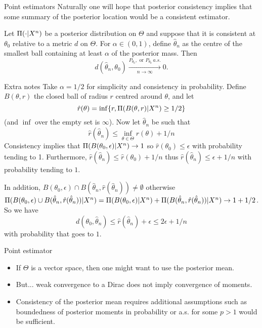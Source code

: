 \begin{frame}{Point estimators}
Naturally one will hope that posterior consistency implies that some summary of the posterior location would be a consistent estimator. 
\pause 

\begin{theorem}
Let $\Pi(\cdot|X^n)$ be a posterior distribution on $\Theta$ and suppose that it is consistent at $\theta_0$ relative to a metric $d$ on $\Theta$. For $\alpha \in (0,1)$, define $\hat{\theta}_n$ as the centre of the smallest ball containing at least $\alpha$ of the posterior mass. Then 
$$
d(\hat{\theta}_n, \theta_0) \xrightarrow[n\to \infty]{P_{\theta_0}, \text{ or } P_{\theta_0}~a.s. } 0. 
$$   
\end{theorem}
\end{frame}


\begin{frame}[allowframebreaks]{Extra notes}
	Take $\alpha = 1/2$ for simplicity and consistency in probability. Define $B(\theta,r)$ the closed ball of radius $r$ centred around $\theta$, and let 
	$$
\hat{r}(\theta) = \inf\{r, \Pi(B(\theta,r) | X^n)\geq 1/2  \}
	$$
	(and $\inf$ over the empty set is $\infty$). Now let $\hat{\theta}_n$ be such that 
	$$
\hat{r}(\hat{\theta}_n) \leq \inf_{\theta \in \Theta} r(\theta) + 1/n
	$$ 
	Consistency implies that $\Pi(B(\theta_0,\epsilon) |X^n) \to 1$ so $\hat{r}(\theta_0) \leq \epsilon$ with probability tending to 1. Furthermore, $\hat{r}(\hat{\theta}_n)  \leq \hat{r}(\theta_0) + 1/n $ thus $\hat{r}(\hat{\theta}_n)  \leq \epsilon + 1/n$ with probability tending to $1$.
 
	In addition, $B(\theta_0,\epsilon)\cap B(\hat{\theta}_n,\hat{r}(\hat{\theta}_n)) \neq \emptyset$ otherwise $\Pi(B(\theta_0,\epsilon)\cup B(\hat{\theta}_n,\hat{r}(\hat{\theta}_n)) |X^n) = \Pi(B(\theta_0,\epsilon)|X^n) + \Pi(B(\hat{\theta}_n,\hat{r}(\hat{\theta}_n)) |X^n) \to 1 + 1/2$. So we have 
	$$
d(\theta_0,\hat{\theta}_n) \leq \hat{r}(\hat{\theta}_n) + \epsilon \leq 2\epsilon + 1/n
	$$
	with probability that goes to $1$. 
\end{frame}

\begin{frame}{Point estimator}
\begin{itemize}
\item If $\Theta$ is a vector space, then one might want to use the \alert{posterior mean}.
\item But... weak convergence to a Dirac does not imply convergence of moments.
\item Consistency of the posterior mean requires additional assumptions such as boundedness of posterior moments in probability or a.s. for some $p>1$ would be sufficient. 
\end{itemize}
\end{frame}

